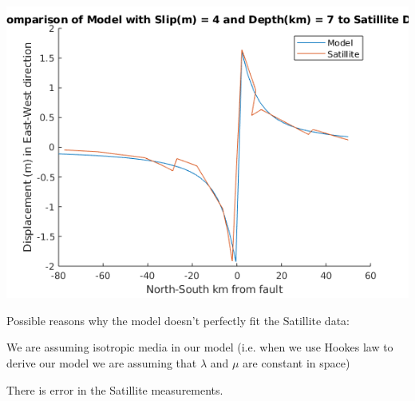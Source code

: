 \documentclass{article}
\begin{document}
\includegraphics[width=\linewidth]{opt_fault.png}

\newpage

\noindent Possible reasons why the model doesn't perfectly fit the Satillite data:

\noindent *We are assuming isotropic media in our model (i.e. when we use Hookes law to derive our model we are assuming that $\lambda$ and $\mu$ are constant in space)


\noindent *There is error in the Satillite measurements.
\end{document}
